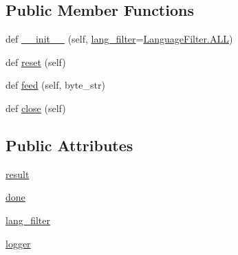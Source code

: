\subsection*{Public Member Functions}
\begin{DoxyCompactItemize}
\item 
def \hyperlink{classpip_1_1__vendor_1_1chardet_1_1universaldetector_1_1UniversalDetector_a9ccb17485411675d89f567aa457baebc}{\+\_\+\+\_\+init\+\_\+\+\_\+} (self, \hyperlink{classpip_1_1__vendor_1_1chardet_1_1universaldetector_1_1UniversalDetector_a29caa6ccd4284571e91a8fde58f1da12}{lang\+\_\+filter}=\hyperlink{classpip_1_1__vendor_1_1chardet_1_1enums_1_1LanguageFilter_aafe107d906ac9495afe1f2997a4797fe}{Language\+Filter.\+A\+LL})
\item 
def \hyperlink{classpip_1_1__vendor_1_1chardet_1_1universaldetector_1_1UniversalDetector_afce2e9be4f989e238a55e2e9eb34c225}{reset} (self)
\item 
def \hyperlink{classpip_1_1__vendor_1_1chardet_1_1universaldetector_1_1UniversalDetector_a95546c11a5ad1eb0db709f540a98bf42}{feed} (self, byte\+\_\+str)
\item 
def \hyperlink{classpip_1_1__vendor_1_1chardet_1_1universaldetector_1_1UniversalDetector_ae3e8249c727d067d4bd2d8f4445bbc76}{close} (self)
\end{DoxyCompactItemize}
\subsection*{Public Attributes}
\begin{DoxyCompactItemize}
\item 
\hyperlink{classpip_1_1__vendor_1_1chardet_1_1universaldetector_1_1UniversalDetector_af8bfeea118b8f5abe90f417c3f00b5e9}{result}
\item 
\hyperlink{classpip_1_1__vendor_1_1chardet_1_1universaldetector_1_1UniversalDetector_a5fa51335dedd2ddaf53245847ebcb911}{done}
\item 
\hyperlink{classpip_1_1__vendor_1_1chardet_1_1universaldetector_1_1UniversalDetector_a29caa6ccd4284571e91a8fde58f1da12}{lang\+\_\+filter}
\item 
\hyperlink{classpip_1_1__vendor_1_1chardet_1_1universaldetector_1_1UniversalDetector_adf2fad75beb55d70a1c6f7cac452dda3}{logger}
\end{DoxyCompactItemize}

